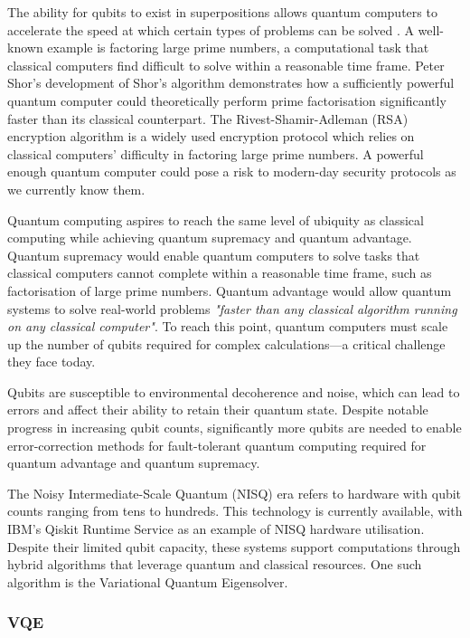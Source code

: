 \documentclass{article}
\begin{document}
{The ability for qubits to exist in superpositions allows quantum computers to accelerate the speed at which certain types of problems can be solved \cite{NielsenChuang2010}. A well-known example is factoring large prime numbers, a computational task that classical computers find difficult to solve within a reasonable time frame. Peter Shor’s development of Shor’s algorithm demonstrates how a sufficiently powerful quantum computer could theoretically perform prime factorisation significantly faster than its classical counterpart\cite{Shor_1997}\cite{minutephysics}. The Rivest-Shamir-Adleman (RSA) encryption algorithm is a widely used encryption protocol which relies on classical computers' difficulty in factoring large prime numbers\cite{encryptionconsulting}. A powerful enough quantum computer could pose a risk to modern-day security protocols as we currently know them. 

Quantum computing aspires to reach the same level of ubiquity as classical computing while achieving quantum supremacy and quantum advantage. Quantum supremacy would enable quantum computers to solve tasks that classical computers cannot complete within a reasonable time frame, such as factorisation of large prime numbers\cite{quera}. Quantum advantage would allow quantum systems to solve real-world problems \textit{"faster than any classical algorithm running on any classical computer"}\cite{quera}. To reach this point, quantum computers must scale up the number of qubits required for complex calculations—a critical challenge they face today.

Qubits are susceptible to environmental decoherence and noise, which can lead to errors and affect their ability to retain their quantum state\cite{Preskill2018}. Despite notable progress in increasing qubit counts, significantly more qubits are needed to enable error-correction methods for fault-tolerant quantum computing required for quantum advantage and quantum supremacy\cite{Willsch2022}.

The Noisy Intermediate-Scale Quantum (NISQ) era refers to hardware with qubit counts ranging from tens to hundreds\cite{Preskill2018}. This technology is currently available, with IBM's Qiskit Runtime Service as an example of NISQ hardware utilisation\cite{ReleaseSummary}. Despite their limited qubit capacity, these systems support computations through hybrid algorithms that leverage quantum and classical resources. One such algorithm is the Variational Quantum Eigensolver.

\subsubsection{VQE}

}
\end{document}
